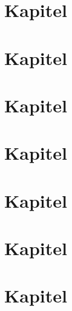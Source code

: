 \chapter{Kapitel} 


\chapter{Kapitel} 


\chapter{Kapitel} 


\chapter{Kapitel} 


\chapter{Kapitel} 


\chapter{Kapitel} 


\chapter{Kapitel} 


